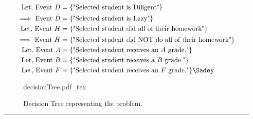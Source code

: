 \begin{align}
	\text{Let, Event } D &= \set{\text{"Selected student is Diligent"}} \nonumber\\
	\text{$\implies$ Event } \bar{D} &= \set{\text{"Selected student is Lazy"}} \nonumber\\
	\text{Let, Event } H &= \set{\text{"Selected student did all of their homework"}} \nonumber\\
	\text{$\implies$ Event } \bar{H} &= \set{\text{"Selected student did NOT do all of their homework"}} \nonumber\\
	\text{Let, Event } A &= \set{\text{"Selected student receives an $A$ grade."}} \nonumber\\
	\text{Let, Event } B &= \set{\text{"Selected student receives a $B$ grade."}} \nonumber\\
		\text{Let, Event } F &= \set{\text{"Selected student receives an $F$ grade."}} \nonumber \Sadey
\end{align}

\begin{figure}[H]
	\centering
	\begin{adjustbox}{max width=\textwidth}
		{decisionTree.pdf_tex}
	\end{adjustbox}
	\caption{Decision Tree representing the problem.}
	\label{fig:decisionTree}
\end{figure}
\noindent\rule{\textwidth}{1pt}